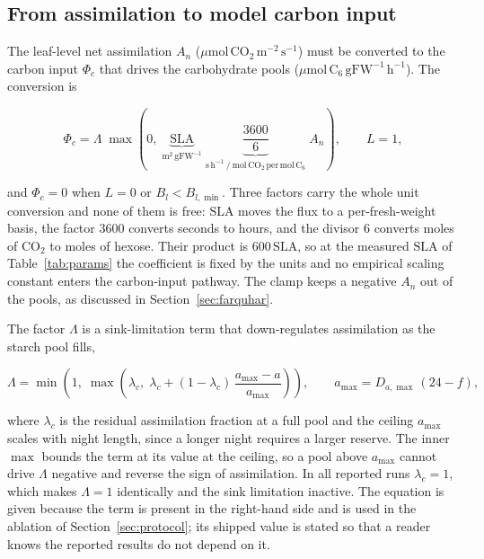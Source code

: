 \subsection{From assimilation to model carbon input}
\label{sec:conversion}

The leaf-level net assimilation $A_n$
($\mu\mathrm{mol\,CO_2\,m^{-2}\,s^{-1}}$) must be converted to the carbon
input $\Phi_c$ that drives the carbohydrate pools
($\mu\mathrm{mol\,C_6\,gFW^{-1}\,h^{-1}}$). The conversion is

\begin{equation}
\Phi_c = \Lambda\;\max\!\left(0,\;
\underbrace{\mathrm{SLA}}_{\mathrm{m^2\,gFW^{-1}}}\;
\underbrace{\frac{3600}{6}}_{\mathrm{s\,h^{-1}\ /\ mol\,CO_2\,per\,mol\,C_6}}\;
A_n \right),
\qquad L = 1 ,
\label{eq:conversion}
\end{equation}

and $\Phi_c = 0$ when $L = 0$ or $B_l < B_{l,\min}$. Three factors carry the whole
unit conversion and none of them is free: $\mathrm{SLA}$ moves the flux to a
per-fresh-weight basis, the factor $3600$ converts seconds to hours, and the
divisor $6$ converts moles of CO$_2$ to moles of hexose. Their product is
$600\,\mathrm{SLA}$, so at the measured $\mathrm{SLA}$ of Table~\ref{tab:params}
the coefficient is fixed by the units and no empirical scaling constant enters the
carbon-input pathway. The clamp keeps a negative $A_n$ out of the pools, as
discussed in Section~\ref{sec:farquhar}.

The factor $\Lambda$ is a sink-limitation term that down-regulates assimilation
as the starch pool fills,

\begin{equation}
\Lambda = \min\!\left(1,\; \max\!\left(\lambda_c,\;
\lambda_c + (1-\lambda_c)\,\frac{a_{\max} - a}{a_{\max}}\right)\right),
\qquad
a_{\max} = D_{a,\max}\,(24 - f),
\label{eq:feedback}
\end{equation}

where $\lambda_c$ is the residual assimilation fraction at a full pool and the
ceiling $a_{\max}$ scales with night length, since a longer night requires a
larger reserve. The inner $\max$ bounds the term at its value at the ceiling, so a
pool above $a_{\max}$ cannot drive $\Lambda$ negative and reverse the sign of
assimilation. In all reported runs $\lambda_c = 1$, which makes $\Lambda = 1$
identically and the sink limitation inactive. The equation is given because the
term is present in the right-hand side and is used in the ablation of
Section~\ref{sec:protocol}; its shipped value is stated so that a reader knows
the reported results do not depend on it.

